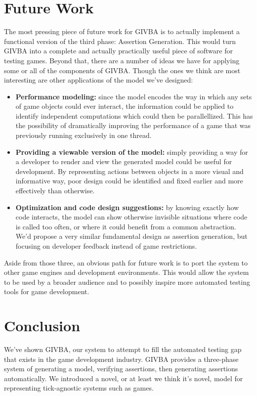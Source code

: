 \documentclass[letterpaper,twocolumn,10pt]{article}
\begin{document}
\section{Future Work}

The most pressing piece of future work for GIVBA is to actually implement a functional version of the third phase: Assertion Generation. This would turn GIVBA into a complete and actually practically useful piece of software for testing games. Beyond that, there are a number of ideas we have for applying some or all of the components of GIVBA. Though the ones we think are most interesting are other applications of the model we've designed:

\begin{itemize}
    \item{\textbf{Performance modeling:}} since the model encodes the way in which any sets of game objects could ever interact, the information could be applied to identify independent computations which could then be parallellized. This has the possibility of dramatically improving the performance of a game that was previously running exclusively in one thread.  
    \item {\textbf{Providing a viewable version of the model:}} simply providing a way for a developer to render and view the generated model could be useful for development. By representing actions between objects in a more visual and informative way, poor design could be identified and fixed earlier and more effectively than otherwise.
    \item{\textbf{Optimization and code design suggestions:}} by knowing exactly how code interacts, the model can show otherwise invisible situations where code is called too often, or where it could benefit from a common abstraction. We'd propose a very similar fundamental design as assertion generation, but focusing on developer feedback instead of game restrictions.
\end{itemize}

Aside from those three, an obvious path for future work is to port the system to other game engines and development environments. This would allow the system to be used by a broader audience and to possibly inspire more automated testing tools for game development.

\section{Conclusion}

We've shown GIVBA, our system to attempt to fill the automated testing gap that exists in the game development industry. GIVBA provides a three-phase system of generating a model, verifying assertions, then generating assertions automatically. We introduced a novel, or at least we think it's novel, model for representing tick-agnostic systems such as games.\\
\end{document}
